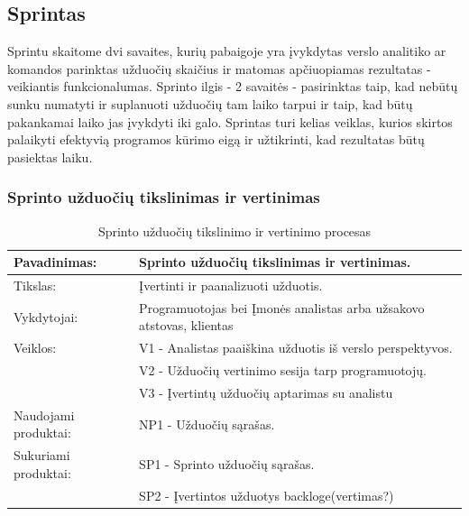 \documentclass{VUMIFPSkursinis}
\begin{document}
	\subsection{Sprintas}
	Sprintu skaitome dvi savaites, kurių pabaigoje yra įvykdytas verslo analitiko ar komandos parinktas užduočių skaičius ir matomas apčiuopiamas rezultatas - veikiantis funkcionalumas. Sprinto ilgis - 2 savaitės - pasirinktas taip, kad nebūtų sunku numatyti ir suplanuoti užduočių tam laiko tarpui ir taip, kad būtų pakankamai laiko jas įvykdyti iki galo. Sprintas turi kelias veiklas, kurios skirtos palaikyti efektyvią programos kūrimo eigą ir užtikrinti, kad rezultatas būtų pasiektas laiku.
	\subsubsection{Sprinto užduočių tikslinimas ir vertinimas}
	\begin{center}
		\begin{table}[ht]
			\caption{Sprinto užduočių tikslinimo ir vertinimo procesas}
		\begin{tabular}{ | l | l | } 
		\hline
	Pavadinimas:         & Sprinto užduočių tikslinimas ir vertinimas.          		 					 \\ \hline
	Tikslas: 	           & Įvertinti ir paanalizuoti užduotis. 																	\\ \hline
	Vykdytojai:          & Programuotojas bei Įmonės analistas arba užsakovo atstovas, klientas  \\ \hline
	Veiklos:             & V1 - Analistas paaiškina užduotis iš verslo perspektyvos. 		          \\
											 & V2 - Užduočių vertinimo sesija tarp programuotojų.					             \\
											 & V3 - Įvertintų užduočių aptarimas su analistu 									          \\ \hline
	Naudojami produktai: & NP1 - Užduočių sąrašas. 													 							           \\ \hline
	Sukuriami produktai: & SP1 - Sprinto užduočių sąrašas. 																	          \\ 
											 & SP2 - Įvertintos užduotys backloge(vertimas?) 										           \\ \hline
\end{tabular}
\end{table}
\end{center}
\end{document}
